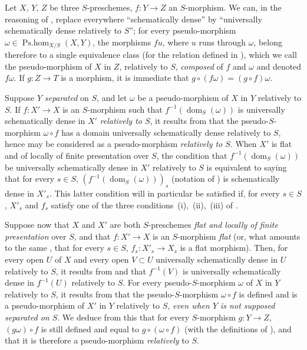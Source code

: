 \begin{env}[20.5.5]
\label{IV.20.5.5}
Let $X$, $Y$, $Z$ be three $S$-preschemes, $f:Y\to Z$ an $S$-morphism.
We can, in the reasoning of , replace everywhere ``schematically dense'' by ``universally schematically dense relatively to $S$'';
for every pseudo-morphism $\omega\in\operatorname{Ps.hom}_{X/S}(X,Y)$, the morphisms $fu$, where $u$ runs through $\omega$, belong therefore to a single equivalence class (for the relation defined in ), which we call the pseudo-morphism of $X$ in $Z$, relatively to $S$, \emph{composed} of $f$ and $\omega$ and denoted $f\omega$.
If $g:Z\to T$ is a morphism, it is immediate that $g\circ(f\omega)=(g\circ f)\omega$.
\end{env}

\begin{env}[20.5.6]
\label{IV.20.5.6}
Suppose $Y$ \emph{separated} on $S$, and let $\omega$ be a pseudo-morphism of $X$ in $Y$ relatively to $S$.
If $f:X'\to X$ is an $S$-morphism such that $f^{-1}(\operatorname{dom}_S(\omega))$ is universally schematically dense in $X'$ \emph{relatively to $S$}, it results from  that the pseudo-$S$-morphism $\omega\circ f$ has a domain universally schematically dense relatively to $S$, hence  may be considered as a pseudo-morphism \emph{relatively to $S$}.
When $X'$ is flat and of locally of finite presentation over $S$, the condition that $f^{-1}(\operatorname{dom}_S(\omega))$ be universally schematically dense in $X'$ relatively to $S$ is equivalent to saying that for every $s\in S$, $(f^{-1}(\operatorname{dom}_S(\omega)))_s$ (notation of ) is schematically dense in $X'_s$.
This latter condition will in particular be satisfied if, for every $s\in S$, $X'_s$ and $f_s$ satisfy one of the three conditions~(i),~(ii),~(iii) of .
\end{env}

\begin{env}[20.5.7]
\label{IV.20.5.7}
Suppose now that $X$ and $X'$ are both $S$-preschemes \emph{flat and locally of finite presentation} over $S$, and that $f:X'\to X$ is an $S$-morphism \emph{flat} (or, what amounts to the same , that for every $s\in S$, $f_s:X'_s\to X_s$ is a flat morphism).
Then, for every open $U$ of $X$ and every open $V\subset U$ universally schematically dense in $U$ relatively to $S$, it results from  and  that $f^{-1}(V)$ is universally schematically dense in $f^{-1}(U)$ relatively to $S$.
For every pseudo-$S$-morphism $\omega$ of $X$ in $Y$ relatively to $S$, it results from  that the pseudo-$S$-morphism $\omega\circ f$ is defined and is a pseudo-morphism of $X'$ in $Y$ relatively to $S$, \emph{even when $Y$ is not supposed separated on $S$}.
We deduce from this that for every $S$-morphism $g:Y\to Z$, $(g\omega)\circ f$ is still defined and equal to $g\circ(\omega\circ f)$ (with the definitions of ), and that it is therefore a pseudo-morphism \emph{relatively} to $S$.
\end{env}

